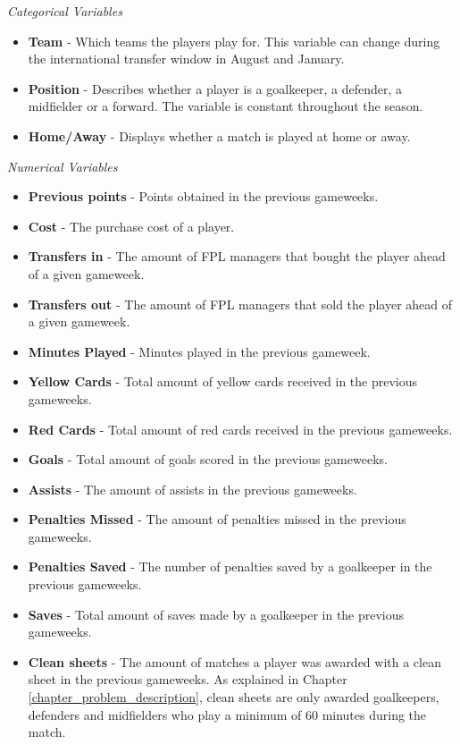 \textit{Categorical Variables}
\newpar
\begin{itemize}
    \item \textbf{Team} - Which teams the players play for. This variable can change during the international transfer window in August and January.  
    
    \item \textbf{Position} - Describes whether a player is a goalkeeper, a defender, a midfielder or a forward. The variable is constant throughout the season.
    \item \textbf{Home/Away} - Displays whether a match is played at home or away.
\end{itemize}
\newpar

\textit{Numerical Variables}
\newpar
\begin{itemize}
    \item \textbf{Previous points} - Points obtained in the previous gameweeks.
    \item \textbf{Cost} - The purchase cost of a player.
    \item \textbf{Transfers in} - The amount of FPL managers that bought the player ahead of a given gameweek.
    \item \textbf{Transfers out} - The amount of FPL managers that sold the player ahead of a given gameweek.
    \item \textbf{Minutes Played} - Minutes played in the previous gameweek.
    \item \textbf{Yellow Cards} - Total amount of yellow cards received in the previous gameweeks.
    \item \textbf{Red Cards} - Total amount of red cards received in the previous gameweeks.
    \item \textbf{Goals} - Total amount of goals scored in the previous gameweeks.
    \item \textbf{Assists} - The amount of assists in the previous gameweeks.
    \item \textbf{Penalties Missed} - The amount of penalties missed in the previous gameweeks.
    \item \textbf{Penalties Saved} - The number of penalties saved by a goalkeeper in the previous gameweeks.
    \item \textbf{Saves} - Total amount of saves made by a goalkeeper in the previous gameweeks.
    \item \textbf{Clean sheets} - The amount of matches a player was awarded with a clean sheet in the previous gameweeks. As explained in Chapter \ref{chapter_problem_description}, clean sheets are only awarded goalkeepers, defenders and midfielders who play a minimum of 60 minutes during the match.
    
\end{itemize}

